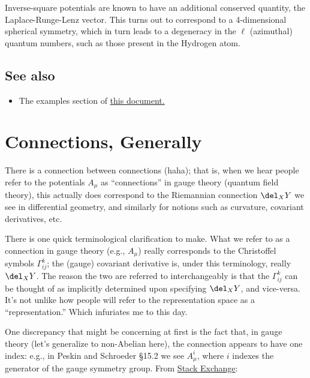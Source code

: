 \documentclass{report}
\begin{document}
\begin{thinnamedbox}
Inverse-square potentials are known to have an additional conserved quantity, 
the Laplace-Runge-Lenz vector. This turns out to correspond to a 4-dimensional 
spherical symmetry, which in turn leads to a degeneracy in the $ \ell $ 
(azimuthal) quantum numbers, such as those present in the Hydrogen atom. 
\end{thinnamedbox}

\subsection*{See also}
\begin{itemize}
\item The examples section of
\href{https://www.uio.no/studier/emner/matnat/fys/FYS3110/h20/pensumliste/symmetry_degeneracy.pdf}{this
document.} 
\end{itemize}

\section{Connections, Generally}
There is a connection between connections (haha); that is, when we hear people 
refer to the potentials $ A_\mu $ as ``connections'' in gauge theory (quantum 
field theory), this actually does correspond to the Riemannian connection 
$ \del_X Y $ we see in differential geometry, and similarly for notions 
such as curvature, covariant derivatives, etc. 

There is one quick terminological clarification to make. What we refer to as 
a connection in gauge theory (e.g., $ A_\mu $) really corresponds to the 
Christoffel symbols $ \Gamma_{ij}^k $; the (gauge) covariant derivative 
is, under this terminology, really $ \del_X Y $. The reason the two are 
referred to interchangeably is that the $ \Gamma_{ij}^k $ can be thought 
of as implicitly determined upon specifying $ \del_{X}Y $, and vice-versa. 
It's not unlike how people will refer to the representation space as a 
``representation.'' Which infuriates me to this day. 

One discrepancy that might be concerning at first is the fact that, in 
gauge theory (let's generalize to non-Abelian here), the connection appears 
to have one index: e.g., in Peskin and Schroeder \S15.2 we see $ A_\mu^i $,
where $ i $ indexes the generator of the gauge symmetry group.
From \href{https://physics.stackexchange.com/questions/432640/is-%E2%88%82-mu-i-e-a-mu-a-covariant-derivative-in-the-differential-geometry-sen}{Stack Exchange}:
\end{document}
